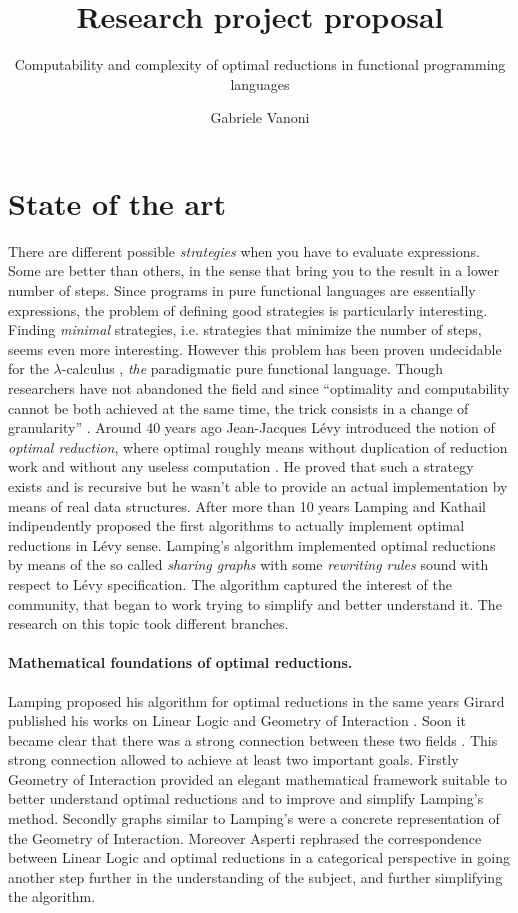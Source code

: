 \documentclass[english]{scrartcl}
\begin{document}
\title{Research project proposal}
\subtitle{Computability and complexity of optimal reductions in functional programming languages}
\author{Gabriele Vanoni}
\date{}
\maketitle
\section{State of the art}
There are different possible \emph{strategies} when you have to evaluate expressions. Some are better than others, in the sense that bring you to the result in a lower number of steps. Since programs in pure functional languages are essentially expressions, the problem of defining good strategies is particularly interesting. Finding \emph{minimal} strategies, i.e. strategies that minimize the number of steps, seems even more interesting. However this problem has been proven undecidable for the $\lambda$-calculus \cite[Section~13.5]{barendregt_lambda_1984}, \emph{the} paradigmatic pure functional language. Though researchers have not abandoned the field and since ``optimality and computability cannot be both achieved at the same time, the trick consists in a change of granularity'' \cite{terese_term_2003}. Around 40 years ago Jean-Jacques Lévy introduced the notion of \emph{optimal reduction}, where optimal roughly means without duplication of reduction work and without any useless computation \cite{levy_reductions_1978}. He proved that such a strategy exists and is recursive but he wasn't able to provide an actual implementation by means of real data structures. After more than 10 years Lamping \cite{lamping_algorithm_1990} and Kathail \cite{kathail_optimal_1990} indipendently proposed the first algorithms to actually implement optimal reductions in Lévy sense. Lamping's algorithm implemented optimal reductions by means of the so called \emph{sharing graphs} with some \emph{rewriting rules} sound with respect to Lévy specification. The algorithm captured the interest of the community, that began to work trying to simplify and better understand it. The research on this topic took different branches.
\paragraph{Mathematical foundations of optimal reductions.}Lamping proposed his algorithm for optimal reductions in the same years Girard published his works on Linear Logic \cite{girard_linear_1987} and Geometry of Interaction \cite{girard_geometry_1989}. Soon it became clear that there was a strong connection between these two fields \cite{gonthier_geometry_1992,gonthier_linear_1992}. This strong connection allowed to achieve at least two important goals. Firstly Geometry of Interaction provided an elegant mathematical framework suitable to better understand optimal reductions and to improve and simplify Lamping's method. Secondly graphs similar to Lamping's were a concrete representation of the Geometry of Interaction. Moreover Asperti rephrased the correspondence between Linear Logic and optimal reductions in a categorical perspective in \cite{asperti_linear_1995} going another step further in the understanding of the subject, and further simplifying the algorithm.
\end{document}
